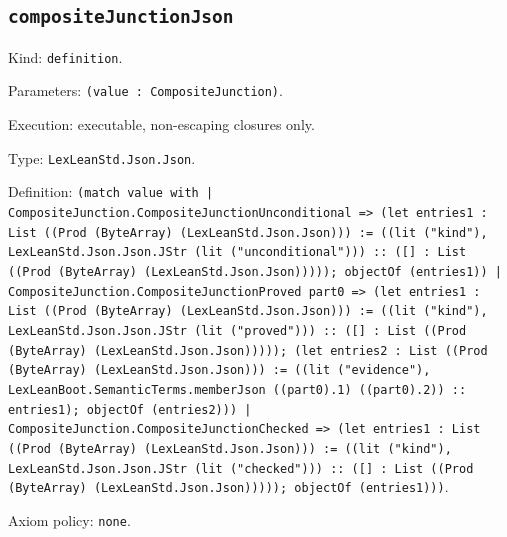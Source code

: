 \documentclass[11pt]{article}
\begin{document}
\subsection*{\texttt{compositeJunctionJson}}
\noindent Kind: \texttt{definition}.\par
\noindent Parameters: \texttt{(value : CompositeJunction)}.\par
\noindent Execution: executable, non-escaping closures only.\par
\noindent Type: \texttt{LexLeanStd.Json.Json}.\par
\noindent Definition: \texttt{(match value with | CompositeJunction.CompositeJunctionUnconditional => (let entries1 : List ((Prod (ByteArray) (LexLeanStd.Json.Json))) := ((lit ("kind"), LexLeanStd.Json.Json.JStr (lit ("unconditional"))) :: ([] : List ((Prod (ByteArray) (LexLeanStd.Json.Json))))); objectOf (entries1)) | CompositeJunction.CompositeJunctionProved part0 => (let entries1 : List ((Prod (ByteArray) (LexLeanStd.Json.Json))) := ((lit ("kind"), LexLeanStd.Json.Json.JStr (lit ("proved"))) :: ([] : List ((Prod (ByteArray) (LexLeanStd.Json.Json))))); (let entries2 : List ((Prod (ByteArray) (LexLeanStd.Json.Json))) := ((lit ("evidence"), LexLeanBoot.SemanticTerms.memberJson ((part0).1) ((part0).2)) :: entries1); objectOf (entries2))) | CompositeJunction.CompositeJunctionChecked => (let entries1 : List ((Prod (ByteArray) (LexLeanStd.Json.Json))) := ((lit ("kind"), LexLeanStd.Json.Json.JStr (lit ("checked"))) :: ([] : List ((Prod (ByteArray) (LexLeanStd.Json.Json))))); objectOf (entries1)))}.\par
\noindent Axiom policy: \texttt{none}.\par
\end{document}
